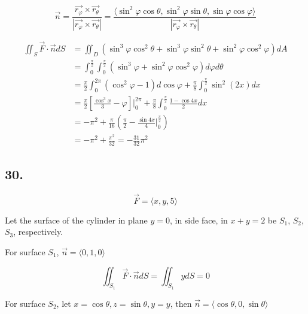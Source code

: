 \documentclass{article}
\begin{document}
  $$\overrightarrow{n} = \frac{\overrightarrow{r_\varphi} \times \overrightarrow{r_\theta}}{|\overrightarrow{r_\varphi} \times \overrightarrow{r_\theta}|} = \frac{\langle \sin^2 \varphi \cos \theta, \sin^2 \varphi \sin \theta, \sin \varphi \cos \varphi \rangle}{|\overrightarrow{r_\varphi} \times \overrightarrow{r_\theta}|}$$

  $$\begin{aligned}
    \iint_S \overrightarrow{F} \cdot \overrightarrow{n} dS &= \iint_D (\sin^3 \varphi  \cos^2 \theta+ \sin^3 \varphi \sin^2 \theta+ \sin^2 \varphi \cos^2 \varphi) dA \\
                                                           &= \int_0^{\frac{\pi}{2}} \int_0^{\frac{\pi}{2}} (\sin^3 \varphi + \sin^2 \varphi \cos^2 \varphi) d\varphi d\theta \\
                                                           &= \frac{\pi}{2} \int_0^{2\pi} (\cos^2 \varphi - 1) d\cos \varphi + \frac{\pi}{8} \int_0^{\frac{\pi}{2}} \sin^2 (2x) dx \\
                                                           &= \frac{\pi}{2} [\frac{\cos^3x}{3} - \varphi]\biggl|_0^{2\pi} + \frac{\pi}{8} \int_0^{\frac{\pi}{2}} \frac{1-\cos 4x}{2} dx \\
                                                           &= -\pi^2 + \frac{\pi}{16} (\frac{\pi}{2} - \frac{\sin 4x}{4}\biggl|_0^{\frac{\pi}{2}}) \\
                                                           &= -\pi^2 + \frac{\pi^2}{32} = -\frac{31}{32}\pi^2
  \end{aligned}
  $$

  \subsection*{30. }

  $$\overrightarrow{F} = \langle x, y, 5 \rangle$$

  Let the surface of the cylinder in plane $y = 0$, in side face, in $x + y = 2$ be $S_1$, $S_2$, $S_3$, respectively.

  For surface $S_1$, $\overrightarrow{n} = \langle 0, 1, 0 \rangle$

  $$\iint_{S_1} \overrightarrow{F} \cdot \overrightarrow{n} dS = \iint_{S_1} y dS = 0$$

  For surface $S_2$, let $x = \cos \theta, z = \sin \theta, y = y$, then $\overrightarrow{n} = \langle \cos \theta, 0, \sin \theta \rangle$
\end{document}
